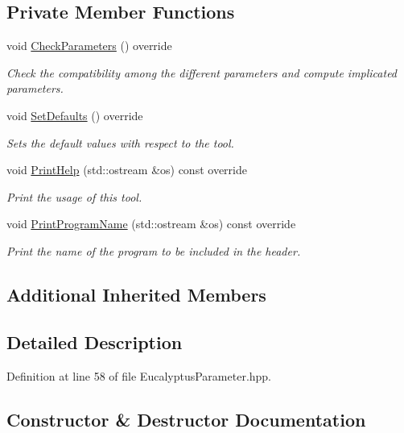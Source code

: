 \subsection*{Private Member Functions}
\begin{DoxyCompactItemize}
\item 
void \hyperlink{classEucalyptusParameter_a669c0350f1d4997568f0d9121abe9c3a}{Check\+Parameters} () override
\begin{DoxyCompactList}\small\item\em Check the compatibility among the different parameters and compute implicated parameters. \end{DoxyCompactList}\item 
void \hyperlink{classEucalyptusParameter_a6a12b064281764f529619b34b732a68d}{Set\+Defaults} () override
\begin{DoxyCompactList}\small\item\em Sets the default values with respect to the tool. \end{DoxyCompactList}\item 
void \hyperlink{classEucalyptusParameter_a420b6819e64f1d3dcc1be2efeeb91467}{Print\+Help} (std\+::ostream \&os) const override
\begin{DoxyCompactList}\small\item\em Print the usage of this tool. \end{DoxyCompactList}\item 
void \hyperlink{classEucalyptusParameter_a028d4f6f94c21b45aa90d90d7328cabf}{Print\+Program\+Name} (std\+::ostream \&os) const override
\begin{DoxyCompactList}\small\item\em Print the name of the program to be included in the header. \end{DoxyCompactList}\end{DoxyCompactItemize}
\subsection*{Additional Inherited Members}


\subsection{Detailed Description}


Definition at line 58 of file Eucalyptus\+Parameter.\+hpp.



\subsection{Constructor \& Destructor Documentation}
\mbox{\label{classEucalyptusParameter_a71d938d0ee56b27250aff0ce1044c320}} 
